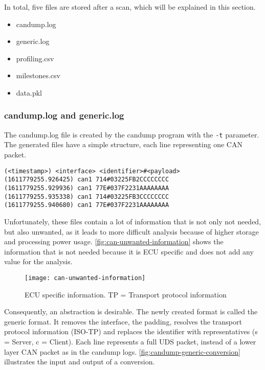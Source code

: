In total, five files are stored after a scan, which will be explained in this section.

\begin{itemize}
    \item candump.log
    \item generic.log
    \item profiling.csv
    \item milestones.csv
    \item data.pkl
\end{itemize}

\subsubsection{candump.log and generic.log}

The candump.log file is created by the candump program with the \texttt{-t} parameter. The generated files have a simple structure, each line representing one CAN packet.

\begin{samepage}
\begin{verbatim}
(<timestamp>) <interface> <identifier>#<payload>
(1611779255.926425) can1 714#03225FB2CCCCCCCC
(1611779255.929936) can1 77E#037F2231AAAAAAAA
(1611779255.935338) can1 714#03225FB3CCCCCCCC
(1611779255.940680) can1 77E#037F2231AAAAAAAA
\end{verbatim}
\end{samepage}

Unfortunately, these files contain a lot of information that is not only not needed, but also unwanted, as it leads to more difficult analysis because of higher storage and processing power usage. \autoref{fig:can-unwanted-information} shows the information that is not needed because it is ECU specific and does not add any value for the analysis.

\begin{figure}[h]
    \centering
    \texttt{[image: can-unwanted-information]}
    \caption{ECU specific information. TP = Transport protocol information}
    \label{fig:can-unwanted-information}
\end{figure}

Consequently, an abstraction is desirable. The newly created format is called the generic format. It removes the interface, the padding, resolves the transport protocol information (ISO-TP) and replaces the identifier with representatives (s = Server, c = Client). Each line represents a full UDS packet, instead of a lower layer CAN packet as in the candump logs. \autoref{fig:candump-generic-conversion} illustrates the input and output of a conversion.

